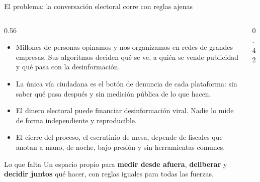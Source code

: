 \documentclass[aspectratio=169,11pt]{beamer}
\begin{document}
\begin{frame}{El problema: la conversación electoral corre con reglas ajenas}
  \begin{columns}[T]
    \begin{column}{0.56\textwidth}
      \begin{itemize}
        \item Millones de personas opinamos y nos organizamos en redes de grandes empresas.
              Sus algoritmos deciden qué se ve, a quién se vende publicidad y qué pasa con la desinformación.
        \item La única vía ciudadana es el botón de denuncia de cada plataforma: sin saber qué pasa después
              y sin medición pública de lo que hacen.
        \item El dinero electoral puede financiar desinformación viral. Nadie lo mide de forma independiente
              y reproducible.
        \item El cierre del proceso, el escrutinio de mesa, depende de fiscales que anotan a mano,
              de noche, bajo presión y sin herramientas comunes.
      \end{itemize}
      \vspace{2pt}
      \begin{alertblock}{Lo que falta}
        Un espacio propio para \textbf{medir desde afuera}, \textbf{deliberar} y \textbf{decidir juntos} qué hacer,
        con reglas iguales para todas las fuerzas.
      \end{alertblock}
    \end{column}
    \begin{column}{0.42\textwidth}
      \centering
    \end{column}
  \end{columns}
\end{frame}
\end{document}
